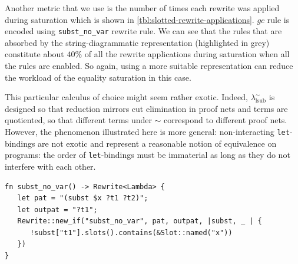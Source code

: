 Another metric that we use is the number of times each rewrite was applied during saturation which is shown in \cref{tbl:slotted-rewrite-applications}.
$gc$ rule is encoded using \texttt{subst\_no\_var} rewrite rule.
We can see that the rules that are absorbed by the string-diagrammatic representation (highlighted in grey) constitute about $40\%$ of all the rewrite applications during saturation when all the rules are enabled.
So again, using a more suitable representation can reduce the workload of the equality saturation in this case.

This particular calculus of choice might seem rather exotic.
Indeed, $\lambda_{\text{lsub}}^{\sim}$ is designed so that reduction mirrors cut elimination in proof nets and terms are quotiented, so that different terms under $\sim$ correspond to different proof nets.
However, the phenomenon illustrated here is more general: non-interacting \texttt{let}-bindings are not exotic and represent a reasonable notion of equivalence on programs: the order of \texttt{let}-bindings must be immaterial as long as they do not interfere with each other.


\begin{listing}
	\begin{verbatim}
fn subst_no_var() -> Rewrite<Lambda> {
   let pat = "(subst $x ?t1 ?t2)";
   let outpat = "?t1";
   Rewrite::new_if("subst_no_var", pat, outpat, |subst, _ | {
      !subst["t1"].slots().contains(&Slot::named("x"))
   })
}
	\end{verbatim}
	\caption{$\lambda_{\text{lsub}}$ $gc$-rule}
	\label{listing:gc_rule}
\end{listing}


